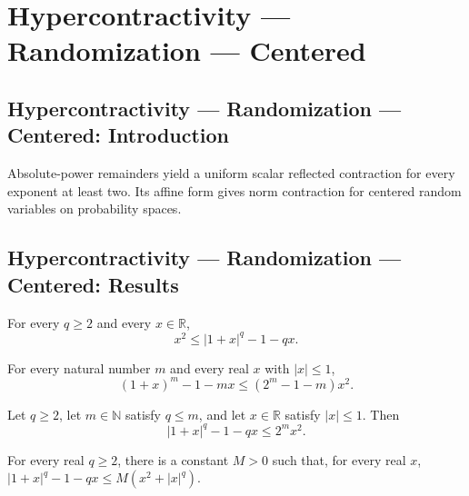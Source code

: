 \section{Hypercontractivity --- Randomization --- Centered}
\subsection*{Hypercontractivity --- Randomization --- Centered: Introduction}
Absolute-power remainders yield a uniform scalar reflected contraction for every exponent at least two. Its affine form gives norm contraction for centered random variables on probability spaces.

\subsection*{Hypercontractivity --- Randomization --- Centered: Results}

\begin{theorem}
\leanok
{}
For every $q\ge2$ and every $x\in\mathbb R$,
\[
x^2\le |1+x|^q-1-qx.
\]
\end{theorem}

\begin{theorem}
\leanok
{}
For every natural number $m$ and every real $x$ with $|x|\le1$,
\[
(1+x)^m-1-mx\le (2^m-1-m)x^2.
\]
\end{theorem}

\begin{theorem}
\leanok
{}
Let $q\ge2$, let $m\in\mathbb N$ satisfy $q\le m$, and let $x\in\mathbb R$ satisfy
$|x|\le1$. Then
\[
|1+x|^q-1-qx\le 2^m x^2.
\]
\end{theorem}

\begin{theorem}
\leanok
{}
For every real $q\ge 2$, there is a constant $M>0$ such that, for every real $x$,
$|1+x|^q-1-qx\le M(x^2+|x|^q)$.
\end{theorem}

